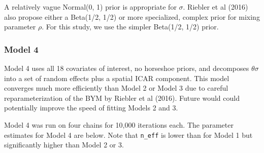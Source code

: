 \documentclass[]{article}
\begin{document}
A relatively vague Normal(0, 1) prior is appropriate for \(\sigma\).
Riebler et al (2016) also propose either a Beta(1/2, 1/2) or more
specialized, complex prior for mixing parameter \(\rho\). For this
study, we use the simpler Beta(1/2, 1/2) prior.

\subsubsection{Model 4}\label{model-4}

Model 4 uses all 18 covariates of interest, no horseshoe priors, and
decomposes \(\theta\sigma\) into a set of random effects plus a spatial
ICAR component. This model converges much more efficiently than Model 2
or Model 3 due to careful reparameterization of the BYM by Riebler et al
(2016). Future would could potentially improve the speed of fitting
Models 2 and 3.

Model 4 was run on four chains for 10,000 iterations each. The parameter
estimates for Model 4 are below. Note that \texttt{n\_eff} is lower than
for Model 1 but significantly higher than Model 2 or 3.
\end{document}
